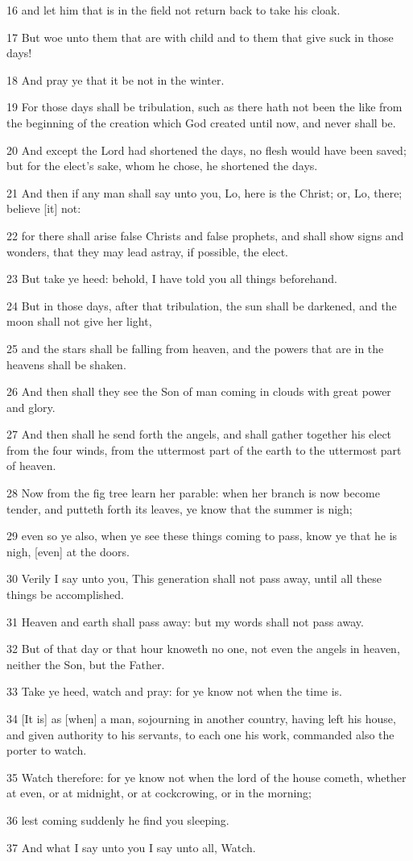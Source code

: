 \par 16 and let him that is in the field not return back to take his cloak.
\par 17 But woe unto them that are with child and to them that give suck in those days!
\par 18 And pray ye that it be not in the winter.
\par 19 For those days shall be tribulation, such as there hath not been the like from the beginning of the creation which God created until now, and never shall be.
\par 20 And except the Lord had shortened the days, no flesh would have been saved; but for the elect's sake, whom he chose, he shortened the days.
\par 21 And then if any man shall say unto you, Lo, here is the Christ; or, Lo, there; believe [it] not:
\par 22 for there shall arise false Christs and false prophets, and shall show signs and wonders, that they may lead astray, if possible, the elect.
\par 23 But take ye heed: behold, I have told you all things beforehand.
\par 24 But in those days, after that tribulation, the sun shall be darkened, and the moon shall not give her light,
\par 25 and the stars shall be falling from heaven, and the powers that are in the heavens shall be shaken.
\par 26 And then shall they see the Son of man coming in clouds with great power and glory.
\par 27 And then shall he send forth the angels, and shall gather together his elect from the four winds, from the uttermost part of the earth to the uttermost part of heaven.
\par 28 Now from the fig tree learn her parable: when her branch is now become tender, and putteth forth its leaves, ye know that the summer is nigh;
\par 29 even so ye also, when ye see these things coming to pass, know ye that he is nigh, [even] at the doors.
\par 30 Verily I say unto you, This generation shall not pass away, until all these things be accomplished.
\par 31 Heaven and earth shall pass away: but my words shall not pass away.
\par 32 But of that day or that hour knoweth no one, not even the angels in heaven, neither the Son, but the Father.
\par 33 Take ye heed, watch and pray: for ye know not when the time is.
\par 34 [It is] as [when] a man, sojourning in another country, having left his house, and given authority to his servants, to each one his work, commanded also the porter to watch.
\par 35 Watch therefore: for ye know not when the lord of the house cometh, whether at even, or at midnight, or at cockcrowing, or in the morning;
\par 36 lest coming suddenly he find you sleeping.
\par 37 And what I say unto you I say unto all, Watch.

